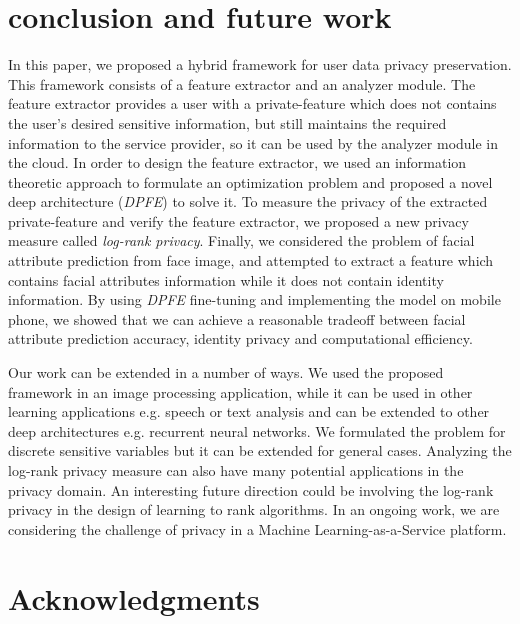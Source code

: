 \documentclass[10pt,journal,compsoc]{IEEEtran}
\begin{document}
\section{conclusion and future work}

In this paper, we proposed a hybrid framework for user data privacy preservation. This framework consists of a feature extractor and an analyzer module. The feature extractor provides a user with a private-feature which does not contains the user's desired sensitive information, but still maintains the required information to the service provider, so it can be used by the analyzer module in the cloud. In order to design the feature extractor, we used an information theoretic approach to formulate an optimization problem and proposed a novel deep architecture (\emph{DPFE}) to solve it. To measure the privacy of the extracted private-feature and verify the feature extractor, we proposed a new privacy measure called \emph{log-rank privacy}. Finally, we considered the problem of facial attribute prediction from face image, and attempted to extract a feature which contains facial attributes information while it does not contain identity information. By using \emph{DPFE} fine-tuning and implementing the model on mobile phone, we showed that we can achieve a reasonable tradeoff between facial attribute prediction accuracy, identity privacy and computational efficiency.

Our work can be extended in a number of ways. We used the proposed framework in an image processing application, while it can be used in other learning applications e.g. speech or text analysis and can be extended to other deep architectures e.g. recurrent neural networks. We formulated the problem for discrete sensitive variables but it can be extended for general cases. Analyzing the log-rank privacy measure can also have many potential applications in the privacy domain. An interesting future direction could be involving the log-rank privacy in the design of learning to rank algorithms. In an ongoing work, we are considering the challenge of privacy in a Machine Learning-as-a-Service platform.











\ifCLASSOPTIONcompsoc
  \section*{Acknowledgments}
\else
\end{document}
